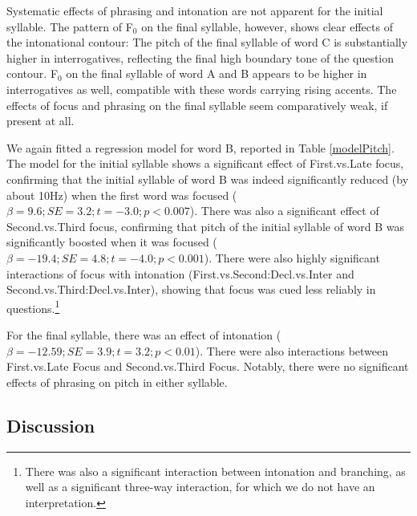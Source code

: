 \documentclass[preprint,review,12pt,authoryear,times]{elsarticle}
\begin{document}
 Systematic effects of phrasing and intonation are not apparent for the initial syllable. The pattern of F$_0$ on the final syllable, however, shows clear effects of the intonational contour: The pitch of the final syllable of word  C is substantially higher in interrogatives, reflecting the final high boundary tone of the question contour. F$_0$ on the final syllable of word A and B appears to be higher in interrogatives as well, compatible with these words carrying rising accents. The effects of focus and phrasing on the final syllable seem comparatively weak, if present at all.

We again fitted a regression model for word B, reported in Table \ref{modelPitch}. The model for the initial syllable shows a significant effect of First.vs.Late focus, confirming that the initial syllable of word B was indeed significantly reduced (by about 10Hz) when the first word was focused ($\beta=9.6; SE=3.2; t=-3.0; p<0.007$). There was also a significant effect of Second.vs.Third focus, confirming that pitch of the initial syllable of word B was significantly boosted when it was focused ($\beta=-19.4; SE=4.8; t=-4.0; p<0.001$). There were also highly significant interactions of focus with intonation (First.vs.Second:Decl.vs.Inter and Second.vs.Third:Decl.vs.Inter), showing that focus was cued less reliably in questions.\footnote{There was also a significant interaction between intonation and branching, as well as a significant three-way interaction, for which we do not have an interpretation.}



For the final syllable, there was an effect of intonation ($\beta=-12.59; SE=3.9; t=3.2; p<0.01$). There were also interactions between First.vs.Late Focus and Second.vs.Third Focus. Notably, there were  no significant effects of phrasing on pitch in either syllable.


\subsection{Discussion}
\end{document}
